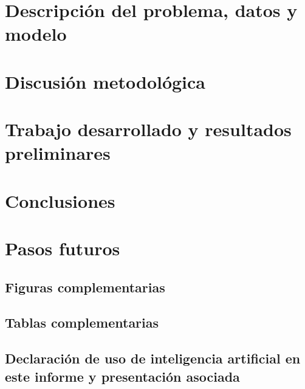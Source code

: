 \documentclass[pdftex,spanish]{pucthesis}
\begin{document}
\chapter[PROBLEMA, DATOS Y MODELO]{Descripci\'on del problema, datos y modelo}


\chapter[DISCUSI\'ON METODOL\'OGICA]{Discusi\'on metodol\'ogica}


\chapter[TRABAJO Y RESULTADOS PRELIMINARES]{Trabajo desarrollado y resultados preliminares}


\chapter[CONCLUSIONES]{Conclusiones}


\chapter[PASOS FUTUROS]{Pasos futuros}


\cleardoublepage
{} \label{references}

\renewcommand{\bibname}{BIBLIOGRAF\'IA}
\setlength{\bibitemsep}{0.3em}
{\small\singlespacing}

\appendix
\newpage
\section[Figuras]{Figuras complementarias}
\label{anx:figuras}


\newpage
\section[Tablas]{Tablas complementarias}
\label{anx:tablas}


\newpage
\section[Declaraci\'on de uso de IA]{Declaraci\'on de uso de inteligencia artificial en este informe y presentaci\'on asociada}

\end{document}
